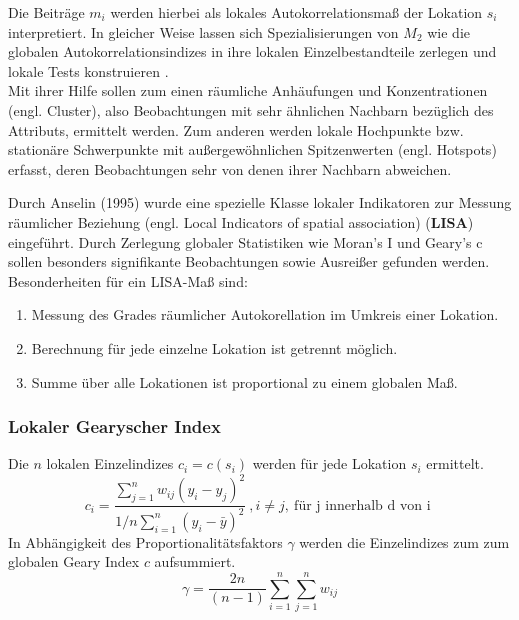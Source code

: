 Die Beiträge $m_i$ werden hierbei als lokales Autokorrelationsmaß der Lokation $s_i$ interpretiert. 
In gleicher Weise lassen sich Spezialisierungen von $M_2$ wie die globalen Autokorrelationsindizes in ihre lokalen Einzelbestandteile zerlegen 
und lokale Tests konstruieren \cite[S.23]{schabenberger_statistical_2005}. \\

Mit ihrer Hilfe sollen zum einen räumliche Anhäufungen und Konzentrationen (engl. Cluster), 
also Beobachtungen mit sehr ähnlichen Nachbarn bezüglich des Attributs, ermittelt werden. 
Zum anderen werden lokale Hochpunkte bzw. stationäre Schwerpunkte mit außergewöhnlichen Spitzenwerten (engl. Hotspots) erfasst, 
deren Beobachtungen sehr von denen ihrer Nachbarn abweichen.

Durch Anselin (1995) wurde eine spezielle Klasse lokaler Indikatoren zur Messung räumlicher Beziehung 
(engl. Local Indicators of spatial association) ($\mathbf{LISA}$) eingeführt. 
Durch Zerlegung globaler Statistiken wie Moran’s I und Geary’s c sollen besonders signifikante Beobachtungen sowie Ausreißer gefunden werden. 
Besonderheiten für ein LISA-Maß sind:
\begin{enumerate}
    \item Messung des Grades räumlicher Autokorellation im Umkreis einer Lokation.
    \item Berechnung für jede einzelne Lokation ist getrennt möglich.
    \item Summe über alle Lokationen ist proportional zu einem globalen Maß.
\end{enumerate}

\subsubsection{Lokaler Gearyscher Index}

Die $n$ lokalen Einzelindizes $c_i=c(s_i)$ werden für jede Lokation $s_i$ ermittelt.
\begin{equation}
    c_i=\frac{\sum_{j=1}^{n} {w_{ij}\left(y_i-y_j\right)^2}}  { 1 \big/ n \sum_{i=1}^{n}\left(y_i-\bar{y}\right)^2}    ~ ,  i\neq j, ~ \text{für j innerhalb d von i }
\end{equation}
In Abhängigkeit des Proportionalitätsfaktors $\gamma$ werden die Einzelindizes zum zum globalen Geary Index $c$ aufsummiert.
\begin{equation*}
    \gamma=\frac{2n}{(n-1)} \sum_{i=1}^{n}\sum_{j=1}^{n} w_{ij}
\end{equation*}

